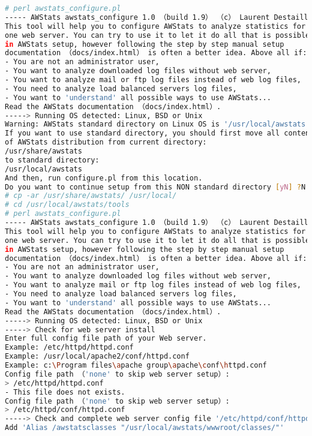 \begin{lstlisting}[language=bash]
# perl awstats_configure.pl
----- AWStats awstats_configure 1.0 （build 1.9） （c） Laurent Destailleur -----
This tool will help you to configure AWStats to analyze statistics for
one web server. You can try to use it to let it do all that is possible
in AWStats setup, however following the step by step manual setup
documentation （docs/index.html） is often a better idea. Above all if:
- You are not an administrator user,
- You want to analyze downloaded log files without web server,
- You want to analyze mail or ftp log files instead of web log files,
- You need to analyze load balanced servers log files,
- You want to 'understand' all possible ways to use AWStats...
Read the AWStats documentation （docs/index.html）.
-----> Running OS detected: Linux, BSD or Unix
Warning: AWStats standard directory on Linux OS is '/usr/local/awstats'.
If you want to use standard directory, you should first move all content
of AWStats distribution from current directory:
/usr/share/awstats
to standard directory:
/usr/local/awstats
And then, run configure.pl from this location.
Do you want to continue setup from this NON standard directory [yN] ?N
# cp -ar /usr/share/awstats/ /usr/local/
# cd /usr/local/awstats/tools
# perl awstats_configure.pl
----- AWStats awstats_configure 1.0 （build 1.9） （c） Laurent Destailleur -----
This tool will help you to configure AWStats to analyze statistics for
one web server. You can try to use it to let it do all that is possible
in AWStats setup, however following the step by step manual setup
documentation （docs/index.html） is often a better idea. Above all if:
- You are not an administrator user,
- You want to analyze downloaded log files without web server,
- You want to analyze mail or ftp log files instead of web log files,
- You need to analyze load balanced servers log files,
- You want to 'understand' all possible ways to use AWStats...
Read the AWStats documentation （docs/index.html）.
-----> Running OS detected: Linux, BSD or Unix
-----> Check for web server install
Enter full config file path of your Web server.
Example: /etc/httpd/httpd.conf
Example: /usr/local/apache2/conf/httpd.conf
Example: c:\Program files\apache group\apache\conf\httpd.conf
Config file path （'none' to skip web server setup）:
> /etc/httpd/httpd.conf
- This file does not exists.
Config file path （'none' to skip web server setup）:
> /etc/httpd/conf/httpd.conf
-----> Check and complete web server config file '/etc/httpd/conf/httpd.conf'
Add 'Alias /awstatsclasses "/usr/local/awstats/wwwroot/classes/"'

\end{lstlisting}
